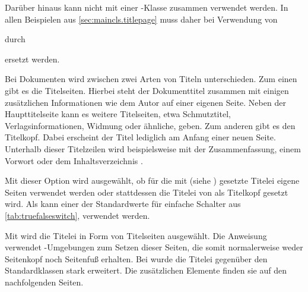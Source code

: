   Darüber hinaus kann  nicht mit einer \KOMAScript-Klasse
  zusammen verwendet werden. In allen Beispielen aus
  \autoref{sec:maincls.titlepage} muss daher bei Verwendung von
durch
  ersetzt werden.
\fi

Bei Dokumenten wird zwischen zwei Arten von Titeln
unterschieden. Zum einen gibt es die Titelseiten. Hierbei steht der
Dokumenttitel zusammen mit einigen zusätzlichen Informationen wie dem Autor
auf einer eigenen Seite. Neben der Haupttitelseite kann es weitere
Titelseiten, etwa Schmutztitel, Verlagsinformationen, Widmung oder ähnliche,
geben. Zum anderen gibt es den Titelkopf. Dabei erscheint der Titel lediglich
am Anfang einer neuen Seite. Unterhalb dieser Titelzeilen wird
beispielsweise mit der
Zusammenfassung, einem Vorwort oder dem Inhaltsverzeichnis
.


\begin{Declaration}
\end{Declaration}%
Mit dieser Option%
 wird ausgewählt, ob für die mit
 (siehe
) gesetzte Titelei eigene
Seiten verwendet werden oder stattdessen die Titelei von
 als Titelkopf
gesetzt wird.  Als  kann einer der Standardwerte für
einfache Schalter aus \autoref{tab:truefalseswitch},
 verwendet werden.

Mit 
wird die Titelei
in Form von Titelseiten ausgewählt. Die Anweisung
 verwendet
-Umgebungen zum Setzen dieser
Seiten, die somit normalerweise weder Seitenkopf noch Seitenfuß erhalten. Bei
{\KOMAScript} wurde die Titelei gegenüber den Standardklassen stark
erweitert. Die zusätzlichen Elemente finden sie auf den nachfolgenden Seiten.

